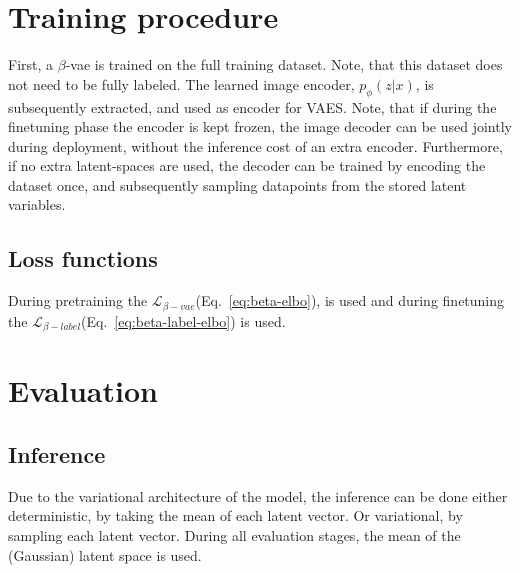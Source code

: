 \section{Training procedure}
First, a $\beta$-vae is trained on the full training dataset. Note, that this dataset does not need to be fully labeled. The learned image encoder, $p_\phi(z|x)$, is subsequently extracted, and used as encoder for VAES. Note, that if during the finetuning phase the encoder is kept frozen, the image decoder can be used jointly during deployment, without the inference cost of an extra encoder. Furthermore, if no extra latent-spaces are used, the decoder can be trained by encoding the dataset once, and subsequently sampling datapoints from the stored latent variables.

\subsection{Loss functions}
During pretraining the $\mathcal{L}_{\beta-vae}$(Eq.~\ref{eq:beta-elbo}), is used and during finetuning the $\mathcal{L}_{\beta-label}$(Eq.~\ref{eq:beta-label-elbo}) is used.

\section{Evaluation}
\subsection{Inference}
Due to the variational architecture of the model, the inference can be done either deterministic, by taking the mean of each latent vector. Or variational, by sampling each latent vector. During all evaluation stages, the mean of the (Gaussian) latent space is used.

